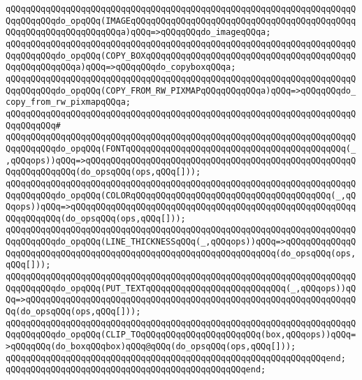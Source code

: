 \verb|qQQqqQQqqQQqqQQqqQQqqQQqqQQqqQQqqQQqqQQqqQQqqQQqqQQqqQQqqQQqqQQqqQQqqQQqqQQqqQQqdo_opqQQq(IMAGEqQQqqQQqqQQqqQQqqQQqqQQqqQQqqQQqqQQqqQQqqQQqqQQqqQQqqQQqqQQqqQQqqQQqa)qQQq=>qQQqqQQqdo_imageqQQqa;|\newline
\verb|qQQqqQQqqQQqqQQqqQQqqQQqqQQqqQQqqQQqqQQqqQQqqQQqqQQqqQQqqQQqqQQqqQQqqQQqqQQqqQQqdo_opqQQq(COPY_BOXqQQqqQQqqQQqqQQqqQQqqQQqqQQqqQQqqQQqqQQqqQQqqQQqqQQqqQQqa)qQQq=>qQQqqQQqdo_copyboxqQQqa;|\newline
\verb|qQQqqQQqqQQqqQQqqQQqqQQqqQQqqQQqqQQqqQQqqQQqqQQqqQQqqQQqqQQqqQQqqQQqqQQqqQQqqQQqdo_opqQQq(COPY_FROM_RW_PIXMAPqQQqqQQqqQQqa)qQQq=>qQQqqQQqdo_copy_from_rw_pixmapqQQqa;|\newline
\verb|qQQqqQQqqQQqqQQqqQQqqQQqqQQqqQQqqQQqqQQqqQQqqQQqqQQqqQQqqQQqqQQqqQQqqQQqqQQqqQQq#|\newline
\verb|qQQqqQQqqQQqqQQqqQQqqQQqqQQqqQQqqQQqqQQqqQQqqQQqqQQqqQQqqQQqqQQqqQQqqQQqqQQqqQQqdo_opqQQq(FONTqQQqqQQqqQQqqQQqqQQqqQQqqQQqqQQqqQQqqQQqqQQq(_,qQQqops))qQQq=>qQQqqQQqqQQqqQQqqQQqqQQqqQQqqQQqqQQqqQQqqQQqqQQqqQQqqQQqqQQqqQQqqQQq(do_opsqQQq(ops,qQQq[]));|\newline
\verb|qQQqqQQqqQQqqQQqqQQqqQQqqQQqqQQqqQQqqQQqqQQqqQQqqQQqqQQqqQQqqQQqqQQqqQQqqQQqqQQqdo_opqQQq(COLORqQQqqQQqqQQqqQQqqQQqqQQqqQQqqQQqqQQqqQQq(_,qQQqops))qQQq=>qQQqqQQqqQQqqQQqqQQqqQQqqQQqqQQqqQQqqQQqqQQqqQQqqQQqqQQqqQQqqQQqqQQq(do_opsqQQq(ops,qQQq[]));|\newline
\verb|qQQqqQQqqQQqqQQqqQQqqQQqqQQqqQQqqQQqqQQqqQQqqQQqqQQqqQQqqQQqqQQqqQQqqQQqqQQqqQQqdo_opqQQq(LINE_THICKNESSqQQq(_,qQQqops))qQQq=>qQQqqQQqqQQqqQQqqQQqqQQqqQQqqQQqqQQqqQQqqQQqqQQqqQQqqQQqqQQqqQQqqQQq(do_opsqQQq(ops,qQQq[]));|\newline
\verb|qQQqqQQqqQQqqQQqqQQqqQQqqQQqqQQqqQQqqQQqqQQqqQQqqQQqqQQqqQQqqQQqqQQqqQQqqQQqqQQqdo_opqQQq(PUT_TEXTqQQqqQQqqQQqqQQqqQQqqQQqqQQq(_,qQQqops))qQQq=>qQQqqQQqqQQqqQQqqQQqqQQqqQQqqQQqqQQqqQQqqQQqqQQqqQQqqQQqqQQqqQQqqQQq(do_opsqQQq(ops,qQQq[]));|\newline
\verb|qQQqqQQqqQQqqQQqqQQqqQQqqQQqqQQqqQQqqQQqqQQqqQQqqQQqqQQqqQQqqQQqqQQqqQQqqQQqqQQqdo_opqQQq(CLIP_TOqQQqqQQqqQQqqQQqqQQqqQQq(box,qQQqops))qQQq=>qQQqqQQq(do_boxqQQqbox)qQQq@qQQq(do_opsqQQq(ops,qQQq[]));|\newline
\verb|qQQqqQQqqQQqqQQqqQQqqQQqqQQqqQQqqQQqqQQqqQQqqQQqqQQqqQQqqQQqqQQqend;|\newline
\verb|qQQqqQQqqQQqqQQqqQQqqQQqqQQqqQQqqQQqqQQqqQQqqQQqend;|\newline
\newline
\newline
